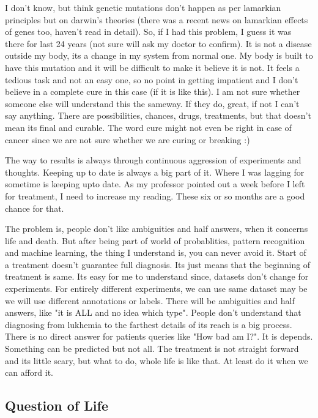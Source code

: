 I don't know, but think genetic mutations don't happen as per lamarkian principles but on darwin's 
theories (there was a recent news on lamarkian effects of genes too, haven't read in detail). 
So, if I had this problem, I guess it was there for last 24 years (not sure will ask my doctor 
to confirm). It is not a disease outside my body, its a change in my system from normal one. My 
body is built to have this mutation and it will be difficult to make it believe it is not. It 
feels a tedious task and not an easy one, so no point in getting impatient and I don't believe in 
a complete cure in this case (if it is like this). I am not sure whether someone else will 
understand this the sameway. If they do, great, if not I can't say anything. There are 
possibilities, chances, drugs, treatments, but that doesn't mean its final and curable. The 
word cure might not even be right in case of cancer since we are not sure whether we are curing 
or breaking :)

The way to results is always through continuous aggression of experiments and thoughts. Keeping 
up to date is always a big part of it. Where I was lagging for sometime is keeping upto date. 
As my professor pointed out a week before I left for treatment, I need to increase my reading. 
These six or so months are a good chance for that. 

The problem is, people don't like ambiguities and half answers, when it concerns life and death. 
But after being part of world of probablities, pattern recognition and machine learning, the thing 
I understand is, you can never avoid it. Start of a treatment doesn't guarantee full diagnosis. 
Its just means that the beginning of treatment is same. Its easy for me to understand since, 
datasets don't change for experiments. For entirely different experiments, we can use same dataset 
may be we will use different annotations or labels. There will be ambiguities and half answers, 
like "it is ALL and no idea which type". People don't understand that diagnosing from lukhemia to 
the farthest details of its reach is a big process. There is no direct answer for patients queries 
like "How bad am I?". It is depends. Something can be predicted but not all. The treatment is not 
straight forward and its little scary, but what to do, whole life is like that. At least do it 
when we can afford it. 

\subsection*{Question of Life} 

